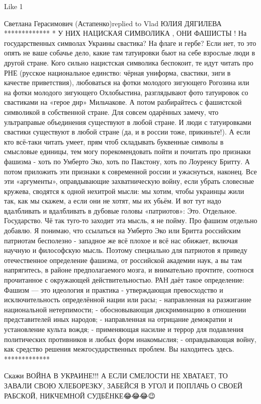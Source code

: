     Like 1

Светлана Герасимович (Астапенко)replied to Vlad
ЮЛИЯ ДЯГИЛЕВА
*************
* У НИХ НАЦИСКАЯ СИМВОЛИКА , ОНИ ФАШИСТЫ !
На государственных символах Украины свастика? На флаге и гербе? Если нет, то это опять не ваше собачье дело, какие там татуировки бьют на себе взрослые люди в другой стране. Кого сильно нацистская символика беспокоит, те идут читать про РНЕ (русское национальное единство: чёрная униформа, свастики, зиги в качестве приветствия), любоваться на фотки молодого зигующего Рогозина или на фотки молодого зигующего Охлобыстина, разглядывают фото татуировок со свастиками на «герое днр» Мильчакове. А потом разбирайтесь с фашистской символикой в собственной стране.
Для совсем одарённых замечу, что ультраправые объединения существуют в любой стране. И люди с татуировками свастики существуют в любой стране (да, и в россии тоже, прикиньте!).
А если кто всё-таки читать умеет, прям чтоб складывать буквенные символы в смысловые единицы, тем могу порекомендовать пойти и почитать про признаки фашизма - хоть по Умберто Эко, хоть по Пакстону, хоть по Лоуренсу Бритту. А потом приложить эти признаки к современной россии и ужаснуться, наконец.
Все эти «аргументы», оправдывающие захватническую войну, если убрать словесные кружева, сводятся к одной нехитрой мысли: мы хотим, чтобы украинцы жили так, как мы скажем, а если они не хотят, мы их убьём.
И вот тут надо вдалбливать и вдалбливать в дубовые головы «патриотов»: Это. Отдельное. Государство.
Чё так туго-то заходит эта мысль, я не пойму.
Про фашизм отдельно добавлю. Я понимаю, что ссылаться на Умберто Эко или Бритта российским патриотам бесполезно - западное же всё плохое и всё нас обижает, включая научную и философскую мысль. Поэтому специально для патриотов я приведу отечественное определение фашизма, от российской академии наук, а вы там напрягитесь, в районе предполагаемого мозга, и внимательно прочтите, соотнося прочитанное с окружающей действительностью.
РАН даёт такое определение:
Фашизм — это идеология и практика
- утверждающая превосходство и исключительность определённой нации или расы;
- направленная на разжигание национальной нетерпимости;
- обосновывающая дискриминацию в отношении представителей иных народов;
- направленная на отрицание демократии и установление культа вождя;
- применяющая насилие и террор для подавления политических противников и любых форм инакомыслия;
- оправдывающая войну, как средство решения межгосударственных проблем.
Вы находитесь здесь.
*************

Скажи ВОЙНА В УКРАИНЕ!!! А ЕСЛИ СМЕЛОСТИ НЕ ХВАТАЕТ, ТО ЗАВАЛИ СВОЮ ХЛЕБОРЕЗКУ,
ЗАБЕЙСЯ В УГОЛ И ПОПЛАЧЬ О СВОЕЙ РАБСКОЙ, НИКЧЕМНОЙ СУДБЁНКЕ😂😂😂😉

